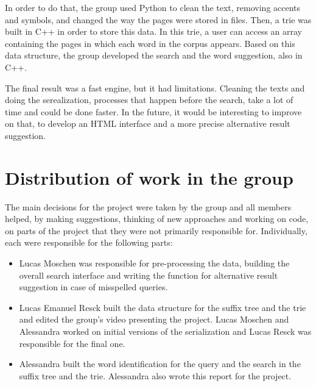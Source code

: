 \documentclass{article}
\begin{document}
In order to do that, the group used Python to clean the text, removing accents and symbols, and changed the way the pages were stored in files. Then, a trie was built in C++ in order to store this data. In this trie, a user can access an array containing the pages in which each word in the corpus appears. Based on this data structure, the group developed the search and the word suggestion, also in C++. 

The final result was a fast engine, but it had limitations. Cleaning the texts and doing the serealization, processes that happen before the search, take a lot of time and could be done faster. In the future, it would be interesting to improve on that, to develop an HTML interface and a more precise alternative result suggestion. 

\section*{Distribution of work in the group}
The main decisions for the project were taken by the group and all members helped, by making suggestions, thinking of new approaches and working on code, on parts of the project that they were not primarily responsible for. Individually, each were responsible for the following parts:

\begin{itemize}
    \item 
    Lucas Moschen was responsible for pre-processing the data, building the overall search interface and writing the function for alternative result suggestion in case of misspelled queries. 
    \item
    Lucas Emanuel Resck built the data structure for the suffix tree and the trie and edited the group's video presenting the project. Lucas Moschen and Alessandra worked on initial versions of the serialization and Lucas Resck was responsible for the final one. 
    \item
    Alessandra built the word identification for the query and the search in the suffix tree and the trie. Alessandra also wrote this report for the project. 

\end{itemize}
\end{document}
